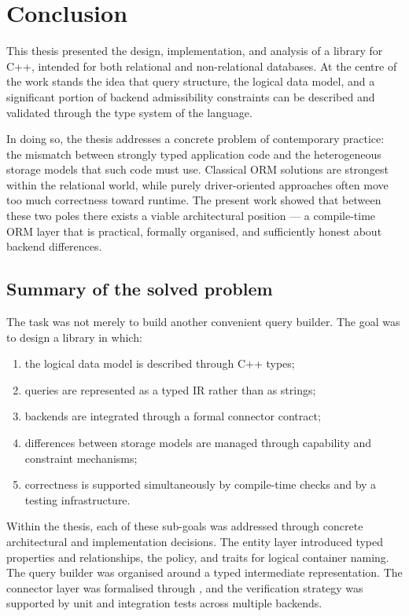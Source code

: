 \section{Conclusion}
\label{sec:conclusion}

This thesis presented the design, implementation, and analysis of a \ORMName{} library for C++, intended for both relational and non-relational databases. At the centre of the work stands the idea that query structure, the logical data model, and a significant portion of backend admissibility constraints can be described and validated through the type system of the language.

In doing so, the thesis addresses a concrete problem of contemporary practice: the mismatch between strongly typed application code and the heterogeneous storage models that such code must use. Classical ORM solutions are strongest within the relational world, while purely driver-oriented approaches often move too much correctness toward runtime. The present work showed that between these two poles there exists a viable architectural position --- a compile-time ORM layer that is practical, formally organised, and sufficiently honest about backend differences.

\subsection{Summary of the solved problem}

The task was not merely to build another convenient query builder. The goal was to design a library in which:

\begin{enumerate}[label=\arabic*.]
    \item the logical data model is described through C++ types;
    \item queries are represented as a typed IR rather than as strings;
    \item backends are integrated through a formal connector contract;
    \item differences between storage models are managed through capability and constraint mechanisms;
    \item correctness is supported simultaneously by compile-time checks and by a testing infrastructure.
\end{enumerate}

Within the thesis, each of these sub-goals was addressed through concrete architectural and implementation decisions. The entity layer introduced typed properties and relationships, the  policy, and traits for logical container naming. The query builder was organised around a typed intermediate representation. The connector layer was formalised through , and the verification strategy was supported by unit and integration tests across multiple backends.

